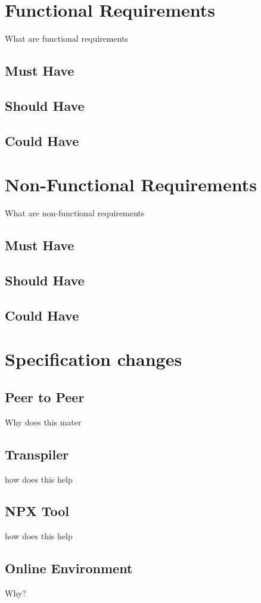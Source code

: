 \documentclass{l4proj}
\begin{document}
\section{Functional Requirements}
\text What are functional requirements
\subsection{Must Have}
\subsection{Should Have}
\subsection{Could Have}
\section{Non-Functional Requirements}
\text What are non-functional requirements
\subsection{Must Have}
\subsection{Should Have}
\subsection{Could Have}

\section{Specification changes}
\subsection{Peer to Peer}
\text Why does this mater

\subsection{Transpiler}
\text how does this help

\subsection{NPX Tool}
\text how does this help

\subsection{Online Environment}
\text Why?
\end{document}
